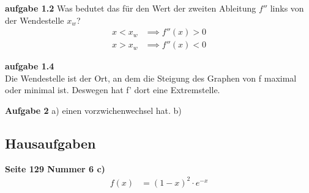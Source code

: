 \documentclass{report}
\begin{document}
\textbf{aufgabe 1.2}
Was bedutet das für den Wert der zweiten Ableitung $f''$ links von der Wendestelle $x_w$?
\begin{align*}
  x<x_w &\implies f''(x)>0\\
  x>x_w & \implies f''(x)<0
\end{align*}

\textbf{aufgabe 1.4}\\
Die Wendestelle ist der Ort, an dem die Steigung des Graphen von f maximal oder minimal ist. Deswegen hat f' dort eine Extremstelle.

\textbf{Aufgabe 2}
a) einen vorzwichenwechsel hat.
b) 

\clearpage
\subsection{Hausaufgaben}
\textbf{Seite 129 Nummer 6 c)}
\begin{align*}
  f(x)&=(1-x)^2\cdot e^{-x}\\
\end{align*}
\end{document}
